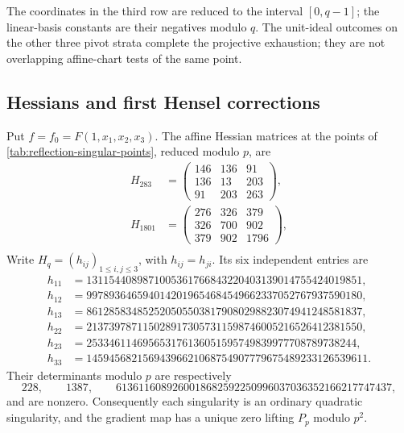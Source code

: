 The coordinates in the third row are reduced to the interval $[0,q-1]$;
the linear-basis constants are their negatives modulo $q$.  The unit-ideal
outcomes on the other three pivot strata complete the projective exhaustion;
they are not overlapping affine-chart tests of the same point.

\subsection{Hessians and first Hensel corrections}

Put $f=f_0=F(1,x_1,x_2,x_3)$.  The affine Hessian matrices at the points of
\cref{tab:reflection-singular-points}, reduced modulo $p$, are
\begin{align*}
H_{283}&=
\begin{pmatrix}
146&136&91\\136&13&203\\91&203&263
\end{pmatrix},\\[3pt]
H_{1801}&=
\begin{pmatrix}
276&326&379\\326&700&902\\379&902&1796
\end{pmatrix},\\[3pt]
\end{align*}
Write $H_q=(h_{ij})_{1\leq i,j\leq3}$, with $h_{ij}=h_{ji}$.  Its six
independent entries are
\begin{align*}
h_{11}&=1311544089871005361766843220403139014755424019851,\\
h_{12}&=9978936465940142019654684549662337052767937590180,\\
h_{13}&=8612858348525205055038179080298823074941248581837,\\
h_{22}&=2137397871150289173057311598746005216526412381550,\\
h_{23}&=253346114695653176136051595749839977708789738244,\\
h_{33}&=14594568215694396621068754907779675489233126539611.
\end{align*}
Their determinants modulo $p$ are respectively
\begin{equation}
 228,\qquad 1387,\qquad
 6136116089260018682592250996037036352166217747437,
 \label{eq:reflection-hessian-dets}
\end{equation}
and are nonzero.  Consequently each singularity is an ordinary quadratic
singularity, and the gradient map has a unique zero lifting $P_p$ modulo
$p^2$.

